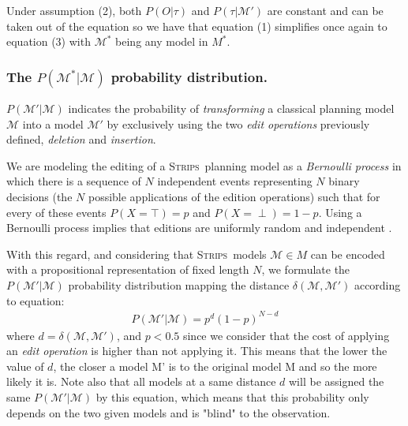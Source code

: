 \documentclass[letterpaper]{article} %
\newcommand{\strips}{\textsc{Strips}}     %
\begin{document}
Under assumption (2), both $P(O|\tau)$ and $P(\tau|\mathcal{M}')$ are constant and can be taken out of the equation so we have that equation (1) simplifies once again to equation (3) with $\mathcal{M}^*$ being any model in $M^*$.


\subsubsection{The $P(\mathcal{M^*}|\mathcal{M})$ probability distribution.} $P(\mathcal{M'}|\mathcal{M})$ indicates the probability of {\em transforming} a classical planning model $\mathcal{M}$ into a model $\mathcal{M'}$ by exclusively using the two {\em edit operations} previously defined, {\em deletion} and {\em insertion}.

We are modeling the editing of a \strips\ planning model as a {\em Bernoulli process} in which there is a sequence of $N$ independent events representing $N$ binary decisions (the $N$ possible applications of the edition operations) such that for every of these events $P(X=\top)=p$ and $P(X=\perp)=1-p$. Using a Bernoulli process implies that editions are uniformly random and independent \cite{devroye2013probabilistic}.

With this regard, and considering that \strips\ models $\mathcal{M}\in M$ can be encoded with a propositional representation of fixed length $N$, we formulate the $P(\mathcal{M'}|\mathcal{M})$ probability distribution mapping the distance $\delta(\mathcal{M},\mathcal{M'})$ according to equation:
\begin{align}
P(\mathcal{M'}|\mathcal{M}) = p^d  (1-p)^{N-d}
\end{align}
where $d=\delta(\mathcal{M},\mathcal{M}')$, and $p<0.5$ since we consider that the cost of applying an {\em edit operation} is higher than not applying it. This means that the lower the value of $d$, the closer a model M' is to the original model M and so the more likely it is. Note also that all models at a same distance $d$ will be assigned the same $P(\mathcal{M'}|\mathcal{M})$ by this equation, which means that this probability only depends on the two given models and is "blind" to the observation.
\end{document}
